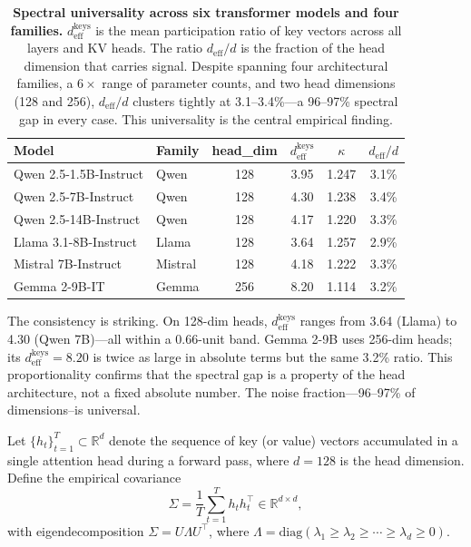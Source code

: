 \documentclass[11pt]{article}
\newcommand{\deff}{d_{\mathrm{eff}}}
\newcommand{\R}{\mathbb{R}}
\begin{document}
\begin{table}[!htbp]
\centering
\caption{\textbf{Spectral universality across six transformer models and four
families.}  $\deff^{\mathrm{keys}}$ is the mean participation ratio of key
vectors across all layers and KV heads.  The ratio $\deff/d$ is the fraction
of the head dimension that carries signal.  Despite spanning four
architectural families, a $6\times$ range of parameter counts, and two head
dimensions (128 and 256), $\deff/d$ clusters tightly at 3.1--3.4\%---a 96--97\%
spectral gap in every case.  This universality is the central empirical finding.}
\label{tab:deff}
\begin{tabular}{llcccc}
\toprule
\textbf{Model} & \textbf{Family} & \textbf{head\_dim} & $\deff^{\mathrm{keys}}$ & $\kappa$ & $\deff/d$ \\
\midrule
Qwen 2.5-1.5B-Instruct & Qwen    & 128 & 3.95 & 1.247 & 3.1\% \\
Qwen 2.5-7B-Instruct   & Qwen    & 128 & 4.30 & 1.238 & 3.4\% \\
Qwen 2.5-14B-Instruct  & Qwen    & 128 & 4.17 & 1.220 & 3.3\% \\
Llama 3.1-8B-Instruct  & Llama   & 128 & 3.64 & 1.257 & 2.9\% \\
Mistral 7B-Instruct    & Mistral & 128 & 4.18 & 1.222 & 3.3\% \\
Gemma 2-9B-IT          & Gemma   & 256 & 8.20 & 1.114 & 3.2\% \\
\bottomrule
\end{tabular}
\end{table}

The consistency is striking.  On 128-dim heads, $\deff^{\mathrm{keys}}$ ranges
from 3.64 (Llama) to 4.30 (Qwen 7B)---all within a 0.66-unit band.  Gemma 2-9B
uses 256-dim heads; its $\deff^{\mathrm{keys}} = 8.20$ is twice as large in
absolute terms but the same 3.2\% ratio.  This proportionality confirms
that the spectral gap is a property of the head architecture, not a fixed
absolute number.  The noise fraction---96--97\% of dimensions--is universal.

Let $\{h_t\}_{t=1}^T \subset \R^d$ denote the sequence of key (or value)
vectors accumulated in a single attention head during a forward pass, where
$d = 128$ is the head dimension.  Define the empirical covariance
\[
  \Sigma = \frac{1}{T}\sum_{t=1}^T h_t h_t^\top \in \R^{d \times d},
\]
with eigendecomposition $\Sigma = U \Lambda U^\top$, where
$\Lambda = \mathrm{diag}(\lambda_1 \geq \lambda_2 \geq \cdots \geq \lambda_d
\geq 0)$.
\end{document}
